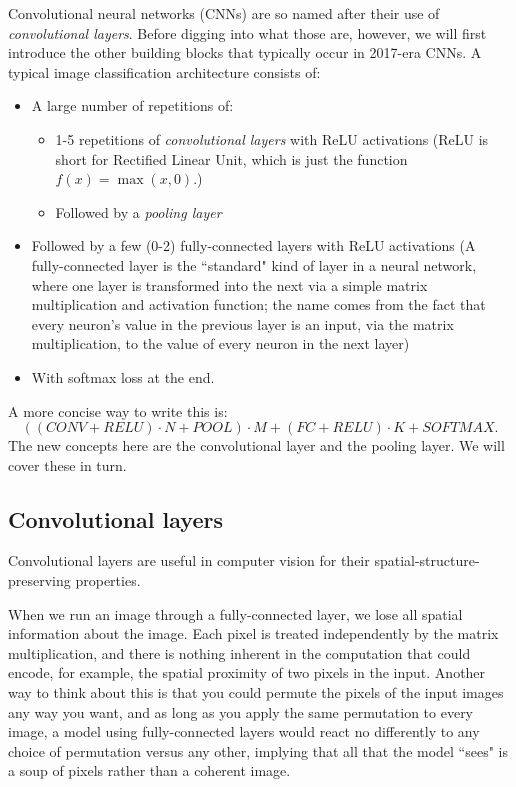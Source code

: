 Convolutional neural networks (CNNs) are so named after their use of \emph{convolutional layers}. Before digging into what those are, however, we will first introduce the other building blocks that typically occur in 2017-era CNNs. A typical image classification architecture consists of:
\begin{itemize}
\item A large number of repetitions of:
\begin{itemize}
    \item 1-5 repetitions of \emph{convolutional layers} with ReLU activations (ReLU is short for Rectified Linear Unit, which is just the function $f(x) = \max(x, 0)$.)
    \item Followed by a \emph{pooling layer}
\end{itemize}
\item Followed by a few (0-2) fully-connected layers with ReLU activations (A fully-connected layer is the ``standard" kind of layer in a neural network, where one layer is transformed into the next via a simple matrix multiplication and activation function; the name comes from the fact that every neuron's value in the previous layer is an input, via the matrix multiplication, to the value of every neuron in the next layer)
\item With softmax loss at the end.
\end{itemize}
A more concise way to write this is:
$$((CONV + RELU) \cdot N + POOL) \cdot M + (FC + RELU) \cdot K + SOFTMAX.$$
The new concepts here are the convolutional layer and the pooling layer. We will cover these in turn.
\subsection{Convolutional layers}
Convolutional layers are useful in computer vision for their spatial-structure-preserving properties. 

When we run an image through a fully-connected layer, we lose all spatial information about the image. Each pixel is treated independently by the matrix multiplication, and there is nothing inherent in the computation that could encode, for example, the spatial proximity of two pixels in the input. Another way to think about this is that you could permute the pixels of the input images any way you want, and as long as you apply the same permutation to every image, a model using fully-connected layers would react no differently to any choice of permutation versus any other, implying that all that the model ``sees" is a soup of pixels rather than a coherent image. 

